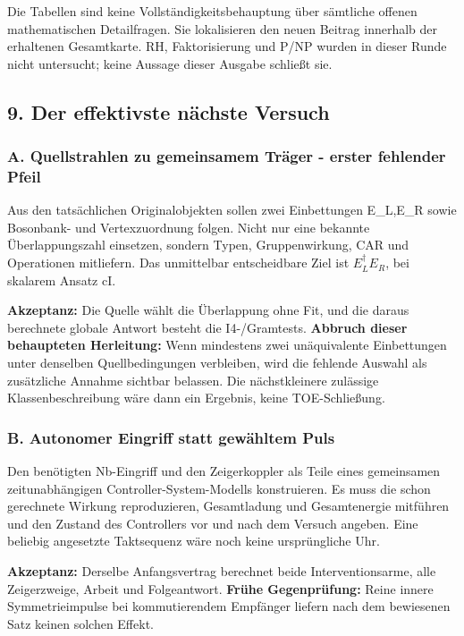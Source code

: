 Die Tabellen sind keine Vollständigkeitsbehauptung über sämtliche
offenen mathematischen Detailfragen. Sie lokalisieren den neuen Beitrag
innerhalb der erhaltenen Gesamtkarte. RH, Faktorisierung und P/NP wurden
in dieser Runde nicht untersucht; keine Aussage dieser Ausgabe schließt
sie.

\subsection{9. Der effektivste nächste
Versuch}\label{der-effektivste-nuxe4chste-versuch}

\subsubsection{A. Quellstrahlen zu gemeinsamem Träger - erster fehlender
Pfeil}\label{a.-quellstrahlen-zu-gemeinsamem-truxe4ger---erster-fehlender-pfeil}

Aus den tatsächlichen Originalobjekten sollen zwei Einbettungen
E\_L,E\_R sowie Bosonbank- und Vertexzuordnung folgen. Nicht nur eine
bekannte Überlappungszahl einsetzen, sondern Typen, Gruppenwirkung, CAR
und Operationen mitliefern. Das unmittelbar entscheidbare Ziel ist
\(E_L^\dagger E_R\), bei skalarem Ansatz cI.

\textbf{Akzeptanz:} Die Quelle wählt die Überlappung ohne Fit, und die
daraus berechnete globale Antwort besteht die I4-/Gramtests.
\textbf{Abbruch dieser behaupteten Herleitung:} Wenn mindestens zwei
unäquivalente Einbettungen unter denselben Quellbedingungen verbleiben,
wird die fehlende Auswahl als zusätzliche Annahme sichtbar belassen. Die
nächstkleinere zulässige Klassenbeschreibung wäre dann ein Ergebnis,
keine TOE-Schließung.

\subsubsection{B. Autonomer Eingriff statt gewähltem
Puls}\label{b.-autonomer-eingriff-statt-gewuxe4hltem-puls}

Den benötigten Nb-Eingriff und den Zeigerkoppler als Teile eines
gemeinsamen zeitunabhängigen Controller-System-Modells konstruieren. Es
muss die schon gerechnete Wirkung reproduzieren, Gesamtladung und
Gesamtenergie mitführen und den Zustand des Controllers vor und nach dem
Versuch angeben. Eine beliebig angesetzte Taktsequenz wäre noch keine
ursprüngliche Uhr.

\textbf{Akzeptanz:} Derselbe Anfangsvertrag berechnet beide
Interventionsarme, alle Zeigerzweige, Arbeit und Folgeantwort.
\textbf{Frühe Gegenprüfung:} Reine innere Symmetrieimpulse bei
kommutierendem Empfänger liefern nach dem bewiesenen Satz keinen solchen
Effekt.

